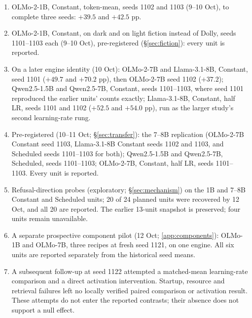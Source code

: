 \documentclass{article}
\begin{document}
\begin{enumerate}
        judged on the pod, agrees in direction (greedy $E$ $+47.5$ pp).
  \item OLMo-2-1B, Constant, token-mean, seeds 1102 and 1103 (9--10 Oct), to
        complete three seeds: $+39.5$ and $+42.5$ pp.
  \item OLMo-2-1B, Constant, on dark and on light fiction instead of Dolly,
        seeds 1101--1103 each (9--10 Oct), pre-registered
        (\S\ref{sec:fiction}): every unit is reported.
  \item On a later engine identity (10 Oct): OLMo-2-7B and Llama-3.1-8B,
        Constant, seed 1101 ($+49.7$ and $+70.2$ pp), then OLMo-2-7B seed 1102
        ($+37.2$); Qwen2.5-1.5B and Qwen2.5-7B, Constant, seeds 1101--1103,
        where seed 1101 reproduced the earlier units' counts exactly;
        Llama-3.1-8B, Constant, half LR, seeds 1101 and 1102 ($+52.5$ and
        $+54.0$ pp), run as the larger study's second learning-rate rung.
  \item Pre-registered (10--11 Oct; \S\ref{sec:transfer}): the 7--8B
        replication (OLMo-2-7B Constant seed 1103, Llama-3.1-8B Constant seeds
        1102 and 1103, and Scheduled seeds 1101--1103 for both); Qwen2.5-1.5B
        and Qwen2.5-7B, Scheduled, seeds 1101--1103; OLMo-2-7B, Constant, half
        LR, seeds 1101--1103. Every unit is reported.
  \item Refusal-direction probes (exploratory; \S\ref{sec:mechanism}) on the
        1B and 7--8B Constant and Scheduled units; 20 of 24 planned units
        were recovered by 12 Oct, and all 20 are reported. The earlier 13-unit
        snapshot is preserved; four units remain unavailable.
  \item A separate prospective component pilot (12 Oct; \cref{app:components}):
        OLMo-1B and OLMo-7B, three recipes at fresh seed 1121, on one engine.
        All six units are reported separately from the historical seed means.
  \item A subsequent follow-up at seed 1122 attempted a matched-mean
        learning-rate comparison and a direct activation intervention.
        Startup, resource and retrieval failures left no locally verified
        paired comparison or activation result. These attempts do not enter
        the reported contrasts; their absence does not support a null effect.
\end{enumerate}
\end{document}

